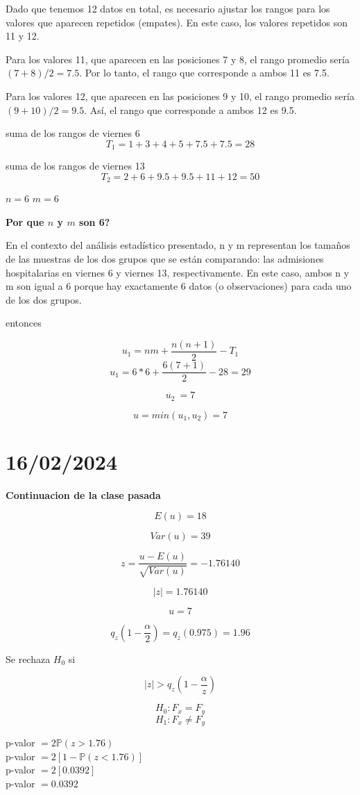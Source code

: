 \documentclass{article}
\begin{document}
Dado que tenemos 12 datos en total, es necesario ajustar los rangos para los valores que aparecen repetidos (empates). En este caso, los valores repetidos son 11 y 12.

Para los valores 11, que aparecen en las posiciones 7 y 8, el rango promedio sería $(7+8)/2 = 7.5$. Por lo tanto, el rango que corresponde a ambos 11 es 7.5.

Para los valores 12, que aparecen en las posiciones 9 y 10, el rango promedio sería $(9+10)/2 = 9.5$. Así, el rango que corresponde a ambos 12 es 9.5.

suma de los rangos de viernes 6
\[T_1 = 1 + 3 + 4 + 5 + 7.5 + 7.5 = 28\]

suma de los rangos de viernes 13
\[T_2 = 2 + 6 + 9.5 + 9.5 + 11 + 12 = 50\]

$n=6$
$m=6$

\textbf{Por que $n$ y $m$ son 6?}

En el contexto del análisis estadístico presentado, n y m representan los tamaños de las muestras de los dos grupos que se están comparando: las admisiones hospitalarias en viernes 6 y viernes 13, respectivamente. En este caso, ambos n y m son igual a 6 porque hay exactamente 6 datos (o observaciones) para cada uno de los dos grupos.

entonces

\[u_1 = nm + \frac{n(n+1)}{2} - T_1\]
\[u_1 = 6*6 + \frac{6(7+1)}{2} - 28 = 29\]

\[u_2\ = 7\]

\[u = min(u_1, u_2) = 7\]

\section{16/02/2024}

\textbf{Continuacion de la clase pasada}

\[E(u) = 18\]

\[Var(u) = 39\]

\[z = \frac{u - E(u)}{\sqrt{Var(u)}} = -1.76140\]

\[|z| = 1.76140\]

\[u = 7\]

\[q_z(1 - \frac{\alpha}{2}) = q_z(0.975) = 1.96\]

Se rechaza $H_0$ si

\[|z| > q_z(1-\frac{\alpha}{z})\]


\[H_0: F_x = F_y\]
\[H_1: F_x \neq F_y\]

p-valor $ = 2 \mathbb{P}(z > 1.76)$ \\
p-valor $ = 2 [1-\mathbb{P}(z < 1.76)]$ \\
p-valor $ = 2 [0.0392]$ \\
p-valor $ = 0.0392$
\end{document}

